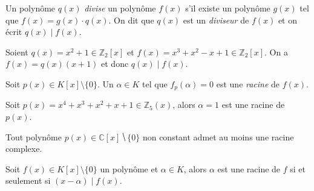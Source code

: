         
            
        
        




\begin{definition}
  \label{def:32}
  Un polynôme  $q(x)$ \emph{divise} un  polynôme $f(x)$ s'il existe un polynôme $g(x)$ tel que $f(x) = g(x) \cdot q(x)$. On dit que $q(x)$ est un \emph{diviseur} de $f(x)$ et on écrit $q(x) \mid f(x)$. 
\end{definition}


\begin{example}
  \label{exe:41}
  Soient $q(x) = x^2 +1 ∈ℤ_2[x]$ et $ f(x) = x^3 + x^2 - x+1 ∈ ℤ_2[x]$. On a
  $f(x) = q(x) (x+1)$ et donc 
   $q(x) \mid f(x)$. 
\end{example}


\begin{definition}
  \label{def:31}
  Soit $p(x) \in K[x] \setminus\{0\}$. Un $\alpha \in K$ tel que $f_p(\alpha) = 0$ est une  \emph{racine} de $f(x)$.  
\end{definition}


\begin{example}
  \label{exe:40}
  Soit $p(x) = x^4 + x^3 + x^2 + x + 1 ∈ ℤ_5(x)$, alors $α = 1$ est une racine de $p(x)$. 
\end{example}


\begin{theorem}
  \label{thr:44}
  Tout polynôme $p(x) ∈ℂ[x] ⧹\{0\}$ non constant admet au moins une racine complexe.
\end{theorem}




\begin{theorem}
  \label{thr:35}
  Soit $f(x)∈ K[x] \setminus \{0\}$ un polynôme  et $\alpha \in K$, alors $\alpha$ est une racine de $f$ si et seulement si $(x- \alpha)  \mid f(x)$. 
\end{theorem}

